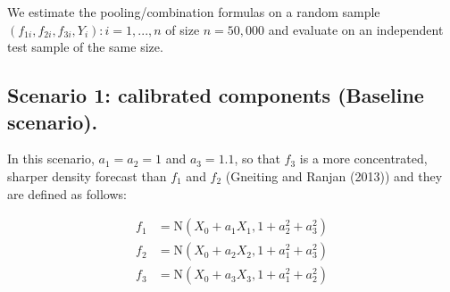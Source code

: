 \documentclass[]{article}
\begin{document}
We estimate the pooling/combination formulas on a random sample
\({(f_{1i} , f_{2i} , f_{3i}, Y_i) : i = 1,..., n}\) of size
\(n = 50,000\) and evaluate on an independent test sample of the same
size.

\hypertarget{scenario-1-calibrated-components-baseline-scenario.}{%
\subsection{Scenario 1: calibrated components (Baseline
scenario).}\label{scenario-1-calibrated-components-baseline-scenario.}}

In this scenario, \(a_1 = a_2 = 1\) and \(a_3 = 1.1\), so that \(f_3\)
is a more concentrated, sharper density forecast than \(f_1\) and
\(f_2\) (Gneiting and Ranjan (2013)) and they are defined as follows:

\[
\begin{aligned}
f_1&=\text{N}(X_0+a_1X_1,1+a^2_2+a^2_3)\\
f_2&=\text{N}(X_0+a_2X_2,1+a^2_1+a^2_3)\\
f_3&=\text{N}(X_0+a_3X_3,1+a^2_1+a^2_2)\\
\end{aligned}
\]
\end{document}

